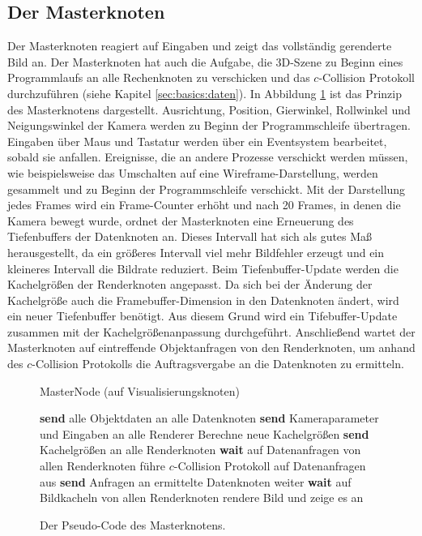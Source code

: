 \subsection{Der Masterknoten}
\label{sec:impl:master}
Der Masterknoten reagiert auf Eingaben und zeigt das vollständig gerenderte Bild an. Der Masterknoten hat auch die Aufgabe, die 3D-Szene zu Beginn eines Programmlaufs an alle Rechenknoten zu verschicken und das $c$-Collision Protokoll durchzuführen (siehe Kapitel \ref{sec:basics:daten}). In Abbildung \ref{fig:impl:masternode} ist das Prinzip des Masterknotens dargestellt. Ausrichtung, Position, Gierwinkel, Rollwinkel und Neigungswinkel der Kamera werden zu Beginn der Programmschleife übertragen. Eingaben über Maus und Tastatur werden über ein Eventsystem bearbeitet, sobald sie anfallen. Ereignisse, die an andere Prozesse verschickt werden müssen, wie beispielsweise das Umschalten auf eine Wireframe-Darstellung, werden gesammelt und zu Beginn der Programmschleife verschickt. Mit der Darstellung jedes Frames wird ein Frame-Counter erhöht und nach 20 Frames, in denen die Kamera bewegt wurde, ordnet der Masterknoten eine Erneuerung des Tiefenbuffers der Datenknoten an. Dieses Intervall hat sich als gutes Maß herausgestellt, da ein größeres Intervall viel mehr Bildfehler erzeugt  und ein kleineres Intervall die Bildrate reduziert. Beim Tiefenbuffer-Update werden die Kachelgrößen der Renderknoten angepasst. Da sich bei der Änderung der Kachelgröße auch die Framebuffer-Dimension in den Datenknoten ändert, wird ein neuer Tiefenbuffer benötigt. Aus diesem Grund wird ein Tifebuffer-Update zusammen mit der Kachelgrößenanpassung durchgeführt. Anschließend wartet der Masterknoten auf eintreffende Objektanfragen von den Renderknoten, um anhand des $c$-Collision Protokolls die Auftragsvergabe an die Datenknoten zu ermitteln.
\begin{figure}[ttt!]
\centering
 \begin{minipage}[t]{12.5cm}
\begin{algorithm}[H]
  \caption{MasterNode (auf Visualisierungsknoten)\label{alg:impl:masternode}} 
    \begin{algorithmic} [1]
      \STATE \textbf{send} alle Objektdaten an alle Datenknoten
	\STATE \textbf{send} Kameraparameter und Eingaben an alle Renderer
	  \STATE Berechne neue Kachelgrößen
	  \STATE \textbf{send} Kachelgrößen an alle Renderknoten
	\ENDIF
	\STATE \textbf{wait} auf Datenanfragen von allen Renderknoten
	\STATE führe $c$-Collision Protokoll auf Datenanfragen aus
	\STATE \textbf{send} Anfragen an ermittelte Datenknoten weiter
	\STATE \textbf{wait} auf Bildkacheln von allen Renderknoten
	\STATE rendere Bild und zeige es an
      \ENDWHILE
    \end{algorithmic}
\end{algorithm}
 \end{minipage}
\caption{\label{fig:impl:masternode}Der Pseudo-Code des Masterknotens.}
\end{figure}

